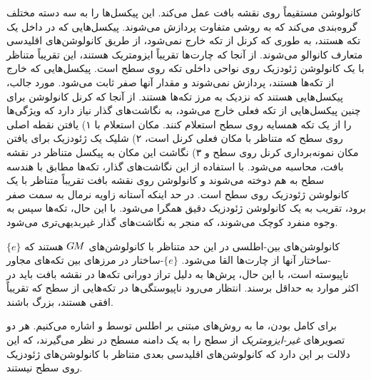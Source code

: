 کانولوشن مستقیماً روی نقشه بافت عمل می‌کند.
این پیکسل‌ها را به سه دسته مختلف گروه‌بندی می‌کند که به روشی متفاوت پردازش می‌شوند.
پیکسل‌هایی که در داخل یک تکه هستند، به طوری که کرنل از تکه خارج نمی‌شود، از طریق کانولوشن‌های اقلیدسی متعارف کانوالو می‌شوند.
از آنجا که چارت‌ها تقریباً ایزومتریک هستند، این تقریباً متناظر با یک کانولوشن ژئودزیک روی نواحی داخلی تکه روی سطح است.
پیکسل‌هایی که خارج از تکه‌ها هستند، پردازش نمی‌شوند و مقدار آنها صفر ثابت می‌شود.
مورد جالب، پیکسل‌هایی هستند که نزدیک به مرز تکه‌ها هستند.
از آنجا که کرنل کانولوشن برای چنین پیکسل‌هایی از تکه فعلی خارج می‌شود، به نگاشت‌های گذار نیاز دارد که ویژگی‌ها را از یک تکه همسایه روی سطح استعلام کنند.
مکان استعلام با
۱) یافتن نقطه اصلی روی سطح که متناظر با مکان فعلی کرنل است،
۲) شلیک یک ژئودزیک برای یافتن مکان نمونه‌برداری کرنل روی سطح و
۳) نگاشت این مکان به پیکسل متناظر در نقشه بافت، محاسبه می‌شود.
با استفاده از این نگاشت‌های گذار، تکه‌ها مطابق با هندسه سطح به هم دوخته می‌شوند و کانولوشن روی نقشه بافت تقریباً متناظر با یک کانولوشن ژئودزیک روی سطح است.
در حد اینکه آستانه زاویه نرمال به سمت صفر برود، تقریب به یک کانولوشن ژئودزیک دقیق همگرا می‌شود.
با این حال، تکه‌ها سپس به وجوه منفرد کوچک می‌شوند، که منجر به نگاشت‌های گذار غیربدیهی‌تری می‌شود.

کانولوشن‌های بین-اطلسی در این حد متناظر با کانولوشن‌های $G\mkern-1.4muM$ هستند که $\{e\}$-ساختار آنها از چارت‌ها القا می‌شود.
$\{e\}$-ساختار در مرزهای بین تکه‌های مجاور ناپیوسته است، با این حال، پرش‌ها به دلیل تراز دورانی تکه‌ها در نقشه بافت باید در اکثر موارد به حداقل برسند.
انتظار می‌رود ناپیوستگی‌ها در تکه‌هایی از سطح که تقریباً افقی هستند، بزرگ باشند.

برای کامل بودن، ما به روش‌های مبتنی بر اطلس توسط \citet{sinha2016deep} و \citet{maron2017convolutional} اشاره می‌کنیم.
هر دو تصویرهای \emph{غیر-ایزومتریک} از سطح را به یک دامنه مسطح در نظر می‌گیرند، که این دلالت بر این دارد که کانولوشن‌های اقلیدسی بعدی متناظر با کانولوشن‌های ژئودزیک روی سطح نیستند.